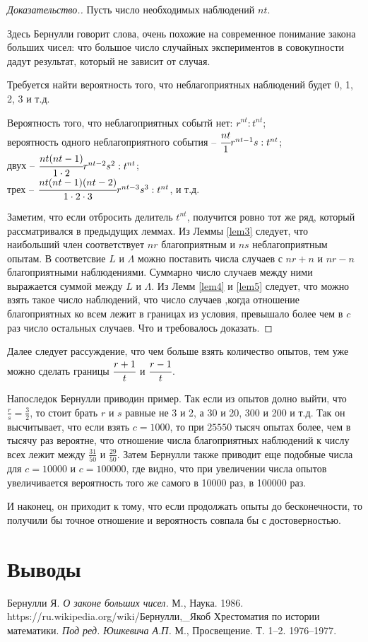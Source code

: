 \documentclass[12pt]{article}
\begin{document}
\begin{proof}[Доказательство.]
Пусть число необходимых наблюдений $nt$.

Здесь Бернулли говорит слова, очень похожие на современное понимание закона больших чисел: что большое число случайных экспериментов в совокупности дадут результат, который не зависит от случая.

Требуется найти вероятность того, что неблагоприятных наблюдений будет 0, 1, 2, 3 и т.д.

Вероятность того, что неблагоприятных событй нет: $r^{nt} : t^{nt}$;\\
вероятность одного неблагоприятного события -- $\cfrac{nt}{1} r^{nt-1} s : t^{nt}$;\\
двух -- $\cfrac{nt(nt-1)}{1 \cdot 2} r^{nt-2} s^2 : t^{nt}$;\\
трех -- $\cfrac{nt(nt-1)(nt-2)}{1 \cdot 2 \cdot 3} r^{nt-3} s^3 : t^{nt}$, и т.д.

Заметим, что если отбросить делитель $t^{nt}$, получится ровно тот же ряд, который рассматривался в предыдущих леммах.
Из Леммы \ref{lem3} следует, что наибольший член соответствует $nr$ благоприятным и $ns$ неблагоприятным опытам.
В соответсвие $L$ и $\Lambda$ можно поставить числа случаев с $nr+n$ и $nr-n$ благоприятными наблюдениями.
Суммарно число случаев между ними выражается суммой между $L$ и $\Lambda$.
Из Лемм \ref{lem4} и \ref{lem5} следует, что можно взять такое число наблюдений, что число случаев ,когда отношение благоприятных ко всем лежит в границах из условия, превышало более чем в  $c$ раз число остальных случаев.
Что и требовалось доказать.
\end{proof}

Далее следует рассуждение, что чем больше взять количество опытов, тем уже можно сделать границы $\cfrac{r+1}{t}$ и $\cfrac{r-1}{t}$.

Напоследок Бернулли приводин пример. 
Так если из опытов долно выйти, что $\frac{r}{s} = \frac{3}{2}$, то стоит брать $r$ и $s$ равные не 3 и 2, а 30 и 20, 300 и 200 и т.д.
Так он высчитывает, что если взять $c=1000$,  то при $25550$ тысяч опытах более, чем в тысячу раз вероятне, что  отношение числа благоприятных наблюдений к числу всех лежит между $\frac{31}{50}$ и $\frac{29}{50}$.
Затем Бернулли также приводит еще подобные числа для $c=10000$ и $c=100000$, где видно, что при увеличении числа опытов увеличивается вероятность того же самого в 10000 раз, в 100000 раз.

И наконец, он приходит к тому, что если продолжать опыты до бесконечности, то получили бы точное отношение и вероятность совпала бы с достоверностью.


\newpage
\section{Выводы}

\newpage
\begin{thebibliography}{99}
 Бернулли Я. \textit{О законе больших чисел.} М., Наука. 1986.
 https://ru.wikipedia.org/wiki/Бернулли,\_Якоб
 Хрестоматия по истории математики. \textit{Под ред. Юшкевича А.П.} М., Просвещение. Т. 1–2. 1976–1977.

\end{thebibliography}
\end{document}
